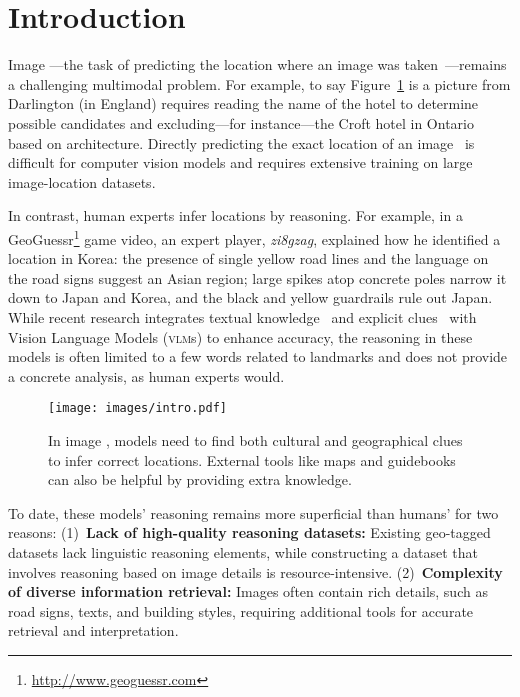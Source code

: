 \section{Introduction}

Image \geoloc---the task of predicting the location where an image
was taken~\cite{hays2008im2gps}---remains a challenging multimodal problem.
%
For example, to say Figure~\ref{fig:task} is a picture from
Darlington (in England) requires reading the name of the hotel to
determine possible candidates and excluding---for instance---the Croft hotel in Ontario based on architecture.
%
Directly predicting the exact location of an
image~\cite{weyand2016planet, haas2023learning, vivanco2024geoclip} is
difficult for computer vision models and requires extensive training on large
image-location datasets.  

In contrast, human experts infer locations by reasoning.
%
For example, in a GeoGuessr\footnote{\url{http://www.geoguessr.com}} game video, an expert player, \textit{zi8gzag}, explained how he identified a location in Korea: the presence of single yellow road lines and the language on the road signs suggest an Asian region; large spikes atop concrete poles narrow it down to Japan and Korea, and the black and yellow guardrails rule out Japan.
%
While recent research integrates textual knowledge~\cite{luo2022g} and explicit clues~\cite{zhang2024can, mendes2024granular, ligeoreasoner} with Vision Language Models (\textsc{vlm}s) to enhance accuracy, the reasoning in these models is often limited to a few words related to landmarks and does not provide a concrete analysis, as human experts would.


\begin{figure}[t]
  \texttt{[image: images/intro.pdf]} \caption{In
  image \geoloc, models need to find both cultural and
  geographical clues to infer correct locations. External tools like
  maps and guidebooks can also be helpful by providing extra
  knowledge.}  \label{fig:task}
\end{figure}


To date, these models' reasoning remains more superficial than humans' for two reasons: (1)~\textbf{Lack of high-quality reasoning datasets:} Existing geo-tagged datasets lack linguistic reasoning elements, while constructing a dataset that involves reasoning based on image details is resource-intensive. (2)~\textbf{Complexity of diverse information retrieval:} Images often contain rich details, such as road signs, texts, and building styles, requiring additional tools for accurate retrieval and interpretation.

